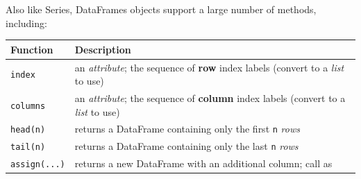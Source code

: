 \documentclass[]{book}
\begin{document}
Also like Series, DataFrames objects support a large number of methods,
including:

\begin{longtable}[]{@{}ll@{}}
\toprule
\begin{minipage}[b]{0.05\columnwidth}\raggedright\strut
Function\strut
\end{minipage} & \begin{minipage}[b]{0.05\columnwidth}\raggedright\strut
Description\strut
\end{minipage}\tabularnewline
\midrule
\endhead
\begin{minipage}[t]{0.05\columnwidth}\raggedright\strut
\texttt{index}\strut
\end{minipage} & \begin{minipage}[t]{0.05\columnwidth}\raggedright\strut
an \emph{attribute}; the sequence of \textbf{row} index labels (convert
to a \emph{list} to use)\strut
\end{minipage}\tabularnewline
\begin{minipage}[t]{0.05\columnwidth}\raggedright\strut
\texttt{columns}\strut
\end{minipage} & \begin{minipage}[t]{0.05\columnwidth}\raggedright\strut
an \emph{attribute}; the sequence of \textbf{column} index labels
(convert to a \emph{list} to use)\strut
\end{minipage}\tabularnewline
\begin{minipage}[t]{0.05\columnwidth}\raggedright\strut
\texttt{head(n)}\strut
\end{minipage} & \begin{minipage}[t]{0.05\columnwidth}\raggedright\strut
returns a DataFrame containing only the first \texttt{n}
\emph{rows}\strut
\end{minipage}\tabularnewline
\begin{minipage}[t]{0.05\columnwidth}\raggedright\strut
\texttt{tail(n)}\strut
\end{minipage} & \begin{minipage}[t]{0.05\columnwidth}\raggedright\strut
returns a DataFrame containing only the last \texttt{n}
\emph{rows}\strut
\end{minipage}\tabularnewline
\begin{minipage}[t]{0.05\columnwidth}\raggedright\strut
\texttt{assign(...)}\strut
\end{minipage} & \begin{minipage}[t]{0.05\columnwidth}\raggedright\strut
returns a new DataFrame with an additional column; call as

\end{minipage}
\end{longtable}
\end{document}
